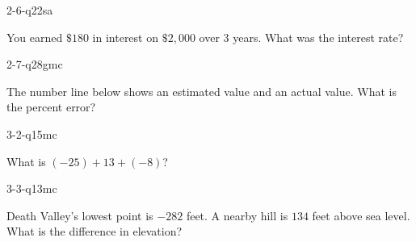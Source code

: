 \begin{practiceQuestion}{2-6-q22}{sa}
\begin{questionText}
You earned $\$180$ in interest on $\$2{,}000$ over $3$ years. What was the interest rate?
\end{questionText}
\end{practiceQuestion}

\begin{practiceQuestion}{2-7-q28}{gmc}
\begin{questionText}
The number line below shows an estimated value and an actual value. What is the percent error?

\begin{center}
\end{center}
\end{questionText}
\end{practiceQuestion}

\begin{practiceQuestion}{3-2-q15}{mc}
\begin{questionText}
What is $(-25) + 13 + (-8)$?
\end{questionText}
\end{practiceQuestion}

\begin{practiceQuestion}{3-3-q13}{mc}
\begin{questionText}
Death Valley's lowest point is $-282$ feet. A nearby hill is $134$ feet above sea level. What is the difference in elevation?
\end{questionText}
\end{practiceQuestion}

